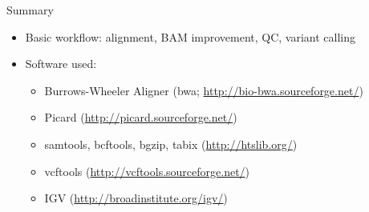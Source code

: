 \documentclass{beamer}
\begin{document}
\begin{frame}{Summary}

  \begin{itemize}
  \item
    Basic workflow: alignment, BAM improvement, QC, variant calling
  \item
    Software used:
    \begin{itemize}
    \item Burrows-Wheeler Aligner (bwa; \url{http://bio-bwa.sourceforge.net/}) %
    \item Picard (\url{http://picard.sourceforge.net/})
    \item samtools, bcftools, bgzip, tabix (\url{http://htslib.org/})
    \item vcftools (\url{http://vcftools.sourceforge.net/})
    \item IGV (\url{http://broadinstitute.org/igv/})
    \end{itemize}
  \end{itemize}

\end{frame}
\end{document}
